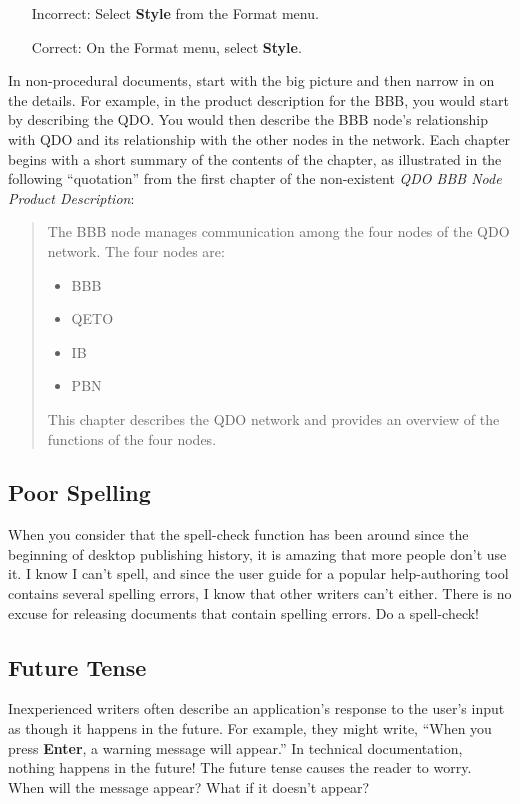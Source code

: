 \documentclass[12pt]{article}
\begin{document}
\begin{itemize} \itemsep -2pt
	\item[Incorrect:] Select \textbf{Style} from the Format menu.
	\item[Correct:] On the Format menu, select \textbf{Style}. 
\end{itemize}

In non-procedural documents, start with the big picture and then narrow in on the details. For example, in the product description for the BBB, you would start by describing the QDO. You would then describe the BBB node's relationship with QDO and its relationship with the other nodes in the network. Each chapter begins with a short summary of the contents of the chapter, as illustrated in the following ``quotation'' from the first chapter of the non-existent \emph{QDO BBB Node Product Description}:

\begin{quote}
The BBB node manages communication among the four nodes of the QDO network. The four nodes are:

\begin{itemize} \itemsep -2pt
	\item BBB
	\item QETO
	\item IB
	\item PBN
\end{itemize}

This chapter describes the QDO network and provides an overview of the functions of the four nodes.
\end{quote}

\subsection{Poor Spelling}

When you consider that the spell-check function has been around since the beginning of desktop publishing history, it is amazing that more people don't use it. I know I can't spell, and since the user guide for a popular help-authoring tool contains several spelling errors, I know that other writers can't either. There is no excuse for releasing documents that contain spelling errors. Do a spell-check! 

\subsection{Future Tense}

Inexperienced writers often describe an application's response to the user's input as though it happens in the future. For example, they might write, ``When you press \textbf{Enter}, a warning message will appear.'' In technical documentation, nothing happens in the future! The future tense causes the reader to worry. When will the message appear? What if it doesn't appear?
\end{document}
